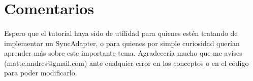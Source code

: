 \documentclass[10pt]{extarticle}
\begin{document}
\section{Comentarios}

\paragraph{}
Espero que el tutorial haya sido de utilidad para quienes estén tratando de implementar un SyncAdapter, o para quienes por simple curiosidad querían aprender más sobre este importante tema. Agradecería mucho que me avises (matte.andres@gmail.com) ante cualquier error en los conceptos o en el código para poder modificarlo.
\end{document}
